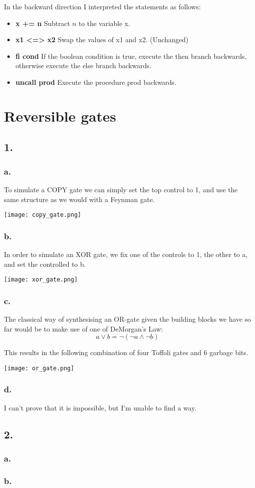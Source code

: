 \documentclass[12pt]{report}
\begin{document}
In the backward direction I interpreted the statements as follows:
\begin{itemize}
\item \textbf{ x += n } Subtract $n$ to the variable x.
\item \textbf{ x1 <=> x2 } Swap the values of x1 and x2. (Unchanged)
\item \textbf{ fi cond } If the boolean condition is true, execute the then branch backwards, otherwise execute the else branch backwards.
\item \textbf{ uncall prod } Execute the procedure prod backwards.
\end{itemize}

\section*{Reversible gates}
\subsection*{1.}
  \subsubsection*{a.}
    To simulate a COPY gate we can simply set the top control to 1, and use the same structure as we would with a Feynman gate.

    \texttt{[image: copy\_gate.png]}
  \subsubsection*{b.}
    In order to simulate an XOR gate, we fix one of the controls to 1, the other to a, and set the controlled to b.

    \texttt{[image: xor\_gate.png]}
  \subsubsection*{c.}
    The classical way of synthesising an OR-gate given the building blocks we have so far would be to make use of one of DeMorgan's Law:
    $$ a \lor b = \neg ( \neg a \land \neg b) $$

    This results in the following combination of four Toffoli gates and 6 garbage bits.

    \texttt{[image: or\_gate.png]}

  \subsubsection*{d.}
    I can't prove that it is impossible, but I'm unable to find a way.

\subsection*{2.}
  \subsubsection*{a.}
    

  \subsubsection*{b.}
\end{document}
